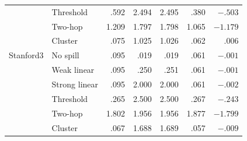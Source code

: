 \documentclass{article}
\begin{document}
\begin{table}[h]
\begin{tabular}{llrrrrr}
 & Threshold & .592 & 2.494 & 2.495 & .380 & $-.503$\\
 & Two-hop & 1.209 & 1.797 & 1.798 & 1.065 & $-1.179$\\
 & Cluster & .075 & 1.025 & 1.026 & .062 & $.006$\\\midrule
Stanford3 & No spill & .095 & .019 & .019 & .061 & $-.001$\\
 & Weak linear & .095 & .250 & .251 & .061 & $-.001$\\
 & Strong linear & .095 & 2.000 & 2.000 & .061 & $-.002$\\
 & Threshold & .265 & 2.500 & 2.500 & .267 & $-.243$\\
 & Two-hop & 1.802 & 1.956 & 1.956 & 1.877 & $-1.799$\\
 & Cluster & .067 & 1.688 & 1.689 & .057 & $-.009$\\
\bottomrule\end{tabular}
\end{table}
\end{document}
